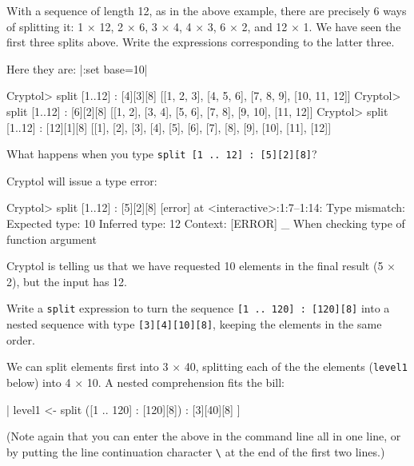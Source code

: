 \restartrepl
\begin{Exercise}\label{ex:split:0}
  With a sequence of length 12, as in the above example, there are
  precisely 6 ways of splitting it: 1 $\times$ 12, 2 $\times$ 6, 3
  $\times$ 4, 4 $\times$ 3, 6 $\times$ 2, and 12 $\times$ 1. We have
  seen the first three splits above. Write the expressions
  corresponding to the latter three.\indSplit
\end{Exercise}
\begin{Answer}
  Here they are:\indSplit
\hidereplin|:set base=10|
\begin{replPrompt}
  Cryptol> split [1..12] : [4][3][8]
  [[1, 2, 3], [4, 5, 6], [7, 8, 9], [10, 11, 12]]
  Cryptol> split [1..12] : [6][2][8]
  [[1, 2], [3, 4], [5, 6], [7, 8], [9, 10], [11, 12]]
  Cryptol> split [1..12] : [12][1][8]
  [[1], [2], [3], [4], [5], [6], [7], [8], [9], [10], [11], [12]]
\end{replPrompt}
\end{Answer}

\restartrepl
\begin{Exercise}\label{ex:split:1}
  What happens when you type
  \texttt{split [1 ..\ 12] :\ [5][2][8]}?\indSplit
\end{Exercise}
\begin{Answer}
Cryptol will issue a type error:\indSplit
\begin{replPrompt}
  Cryptol> split [1..12] : [5][2][8]
  [error] at <interactive>:1:7--1:14:
    Type mismatch:
      Expected type: 10
      Inferred type: 12
      Context: [ERROR] _
      When checking type of function argument
\end{replPrompt}
Cryptol is telling us that we have requested 10 elements in the final
result (5 $\times$ 2), but the input has 12.
\end{Answer}

\begin{Exercise}\label{ex:split:2}
  Write a \texttt{split} expression to turn the sequence \texttt{[1 ..\ 120]
    :\ [120][8]} into a nested sequence with type {\tt [3][4][10][8]},
  keeping the elements in the same order.\indSplit {}  \indComp
\end{Exercise}
\begin{Answer}
  We can split elements first into 3 $\times$ 40, splitting each
  of the the elements ({\tt level1} below) into 4 $\times$ 10. A nested
  comprehension fits the bill:\indComp
\restartrepl
\begin{replinVerb}
  [ split level1 : [4][10][8]
  | level1 <- split ([1 .. 120] : [120][8]) : [3][40][8]
  ]
\end{replinVerb}
(Note again that you can enter the above in the command line all in
one line, or by putting the line continuation character
\texttt{\textbackslash} at the end of the first two
lines.)\indLineCont {}
\end{Answer}

